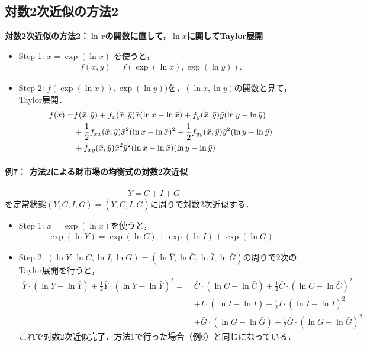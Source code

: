 \documentclass[a4paper,12pt,onecolumn,oneside,notitlepage,final]{article}
\begin{document}
\subsection{対数2次近似の方法2}
\begin{itembox}[l]{{\bf 対数2次近似の方法2：$\ln x$の関数に直して，$\ln x$に関してTaylor展開}}
\begin{itemize}
\item Step 1: $x = \exp(\ln x)$ を使うと，
\begin{align}
f(x,y) = f(\exp(\ln x), \exp(\ln y)).
\end{align}
\item Step 2: $f(\exp(\ln x)), \exp(\ln y))$を，$(\ln x, \ln y)$の関数と見て，Taylor展開．
\begin{align}
f(x) = &f(\bar x, \bar y) + f_x(\bar x, \bar y) \bar x (\ln x - \ln \bar x) + f_y(\bar x, \bar y) \bar y (\ln y - \ln \bar y) \notag \\
&+ \frac{1}{2}f_{xx}(\bar x, \bar y) \bar x^2 (\ln x - \ln \bar x)^2 + \frac{1}{2} f_{yy} (\bar x, \bar y) \bar y^2 (\ln y - \ln \bar y) \notag \\
&+ f_{xy}(\bar x, \bar y) \bar x^2 \bar y^2 (\ln x - \ln \bar x) (\ln y - \ln \bar y)
\end{align}
\end{itemize}
\end{itembox}

\paragraph{例7： 方法2による財市場の均衡式の対数2次近似}
\begin{align*}
Y = C + I + G
\end{align*}
を定常状態$(Y,C,I,G) = (\bar Y, \bar C, \bar I, \bar G)$に周りで対数2次近似する．
\begin{itemize}
\item Step 1: $x = \exp(\ln x)$を使うと，
\begin{align*}
\exp(\ln Y) = \exp(\ln C)+ \exp(\ln I) + \exp(\ln G)
\end{align*}
\item Step 2: $(\ln Y, \ln C, \ln I, \ln G) = (\ln \bar Y, \ln \bar C, \ln \bar I, \ln \bar G)$の周りで2次のTaylor展開を行うと，
\begin{align*}
\bar Y \cdot (\ln Y - \ln \bar Y) + \frac{1}{2}\bar Y \cdot (\ln Y - \ln \bar Y)^2 = \; &\bar C \cdot (\ln C -\ln \bar C) + \frac{1}{2} \bar C \cdot (\ln C - \ln \bar C)^2 \\
&+ \bar I \cdot (\ln I - \ln \bar I) + \frac{1}{2} \bar I \cdot (\ln I - \ln \bar I)^2 \\
&+ \bar G \cdot (\ln G - \ln \bar G) + \frac{1}{2} \bar G \cdot (\ln G - \ln \bar G)^2
\end{align*}
これで対数2次近似完了．方法1で行った場合（例6）と同じになっている．
\end{itemize}
\end{document}
